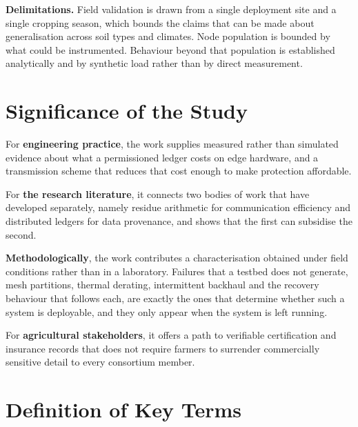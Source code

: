 \documentclass[12pt,a4paper,oneside]{book}
\begin{document}
\textbf{Delimitations.} Field validation is drawn from a single deployment site
and a single cropping season, which bounds the claims that can be made about
generalisation across soil types and climates. Node population is bounded by
what could be instrumented. Behaviour beyond that population is established
analytically and by synthetic load rather than by direct measurement.

\section{Significance of the Study}
\label{sec:significance}

For \textbf{engineering practice}, the work supplies measured rather than
simulated evidence about what a permissioned ledger costs on edge hardware, and
a transmission scheme that reduces that cost enough to make protection
affordable.

For \textbf{the research literature}, it connects two bodies of work that have
developed separately, namely residue arithmetic for communication efficiency and
distributed ledgers for data provenance, and shows that the first can subsidise
the second.

\textbf{Methodologically}, the work contributes a characterisation obtained under
field conditions rather than in a laboratory. Failures that a testbed does not
generate, mesh partitions, thermal derating, intermittent backhaul and the
recovery behaviour that follows each, are exactly the ones that determine
whether such a system is deployable, and they only appear when the system is
left running.

For \textbf{agricultural stakeholders}, it offers a path to verifiable
certification and insurance records that does not require farmers to surrender
commercially sensitive detail to every consortium member.

\section{Definition of Key Terms}
\label{sec:definitions}
\end{document}
